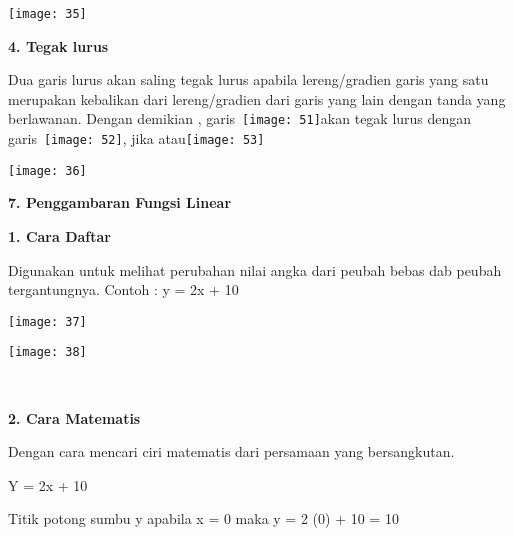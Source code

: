 \documentclass[11pt,fleqn]{book} %
\begin{document}
\begin{center}
\noindent \texttt{[image: 35]}
\end{center}

\noindent \textbf{4.   Tegak lurus}

\noindent Dua garis lurus akan saling tegak lurus apabila lereng/gradien garis yang satu merupakan kebalikan dari lereng/gradien dari garis yang lain dengan tanda yang berlawanan. Dengan demikian , garis~\texttt{[image: 51]}akan tegak lurus dengan garis~\texttt{[image: 52]}, jika atau\texttt{[image: 53]}

\begin{center}
\noindent \texttt{[image: 36]}
\end{center}

\noindent 

\noindent \textbf{7.  Penggambaran Fungsi Linear}

\textbf{1. Cara Daftar}

\noindent Digunakan untuk melihat perubahan nilai angka dari peubah bebas dab peubah tergantungnya. Contoh :
\noindent y = 2x + 10
\begin{center}
\noindent \texttt{[image: 37]}
\end{center}

\noindent 

\noindent 

\begin{center}
\noindent \texttt{[image: 38]}
\end{center}

\noindent 

\noindent 

 

~ ~ ~ ~

\noindent 

\noindent \textbf{2. Cara Matematis}

\noindent \textbf{    }

\textbf{   }Dengan cara mencari ciri matematis dari persamaan yang bersangkutan.

     Y = 2x + 10

\noindent Titik potong sumbu y apabila x = 0 maka y = 2 (0) + 10 = 10~~~~~ ~~~~~~~~~~~~~~~~~~~~~~~~~~~~~~~~~~~~~~~~~~~
\end{document}
